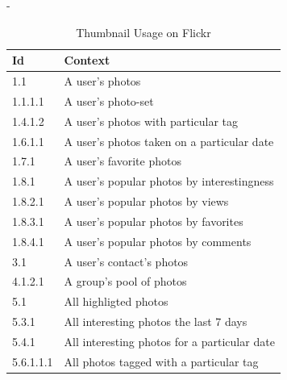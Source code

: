 \begin{table}[!b]
  \centering
  \strictpagechecktrue
  \begin{adjustwidth*}{0em}{-\wholemargin}
    \caption{Thumbnail Usage on Flickr}
    \label{table:flickr.thumbnail.usage}

    \begin{center}
      \begin{tabular}{ll}

        \toprule
        Id & Context \\
        \midrule

        1.1 &
        A user's photos \\

        1.1.1.1 &
        A user's photo-set \\

        1.4.1.2 &
        A user's photos with particular tag \\

        1.6.1.1 &
        A user's photos taken on a particular date \\

        1.7.1 &
        A user's favorite photos \\

        1.8.1 &
        A user's popular photos by interestingness \\

        1.8.2.1 &
        A user's popular photos by views \\

        1.8.3.1 &
        A user's popular photos by favorites \\

        1.8.4.1 &
        A user's popular photos by comments \\

        3.1 &
        A user's contact's photos \\

        4.1.2.1 &
        A group's pool of photos \\

        5.1 &
        All highligted photos \\

        5.3.1 &
        All interesting photos the last 7 days \\

        5.4.1 &
        All interesting photos for a particular date \\

        5.6.1.1.1 &
        All photos tagged with a particular tag \\


\end{tabular}
\end{center}
\end{adjustwidth*}
\end{table}
